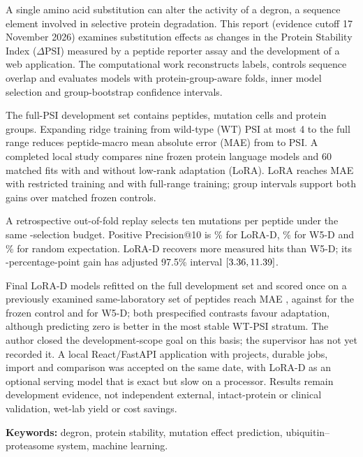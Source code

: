 
A single amino acid substitution can alter the activity of a degron, a sequence element involved in
selective protein degradation. This report (evidence cutoff 17 November 2026) examines
substitution effects as changes in the Protein Stability Index ($\Delta$PSI) measured by a peptide
reporter assay and the development of a web application.
The computational work reconstructs labels, controls sequence overlap and evaluates models with
protein-group-aware folds, inner model selection and group-bootstrap confidence intervals.

The full-PSI development set contains \nVthreeNPeptides{} peptides, \nVthreeNCells{} mutation cells
and \nVthreeNGroups{} protein groups. Expanding ridge training from wild-type (WT) PSI at most 4 to the full
range reduces peptide-macro mean absolute error (MAE) from \nVthreeRidgeB{} to \nVthreeRidgeD{} PSI.
A completed local study compares nine frozen protein language models and 60 matched fits with
and without low-rank adaptation (LoRA). LoRA reaches \nCampaignLoraB{} MAE with restricted
training and \nCampaignLoraD{} with full-range training; group intervals support both gains over
matched frozen controls.

A retrospective out-of-fold replay selects ten mutations per peptide under the same
\nPrioritySelections{}-selection budget. Positive Precision@10 is \nPriorityLoraPrecision\% for
LoRA-D, \nPriorityWfivePrecision\% for W5-D and \nPriorityRandomPrecision\% for random
expectation. LoRA-D recovers \nPriorityExtraHits{} more measured hits than W5-D; its
\nPriorityDeltaWfive{}-percentage-point gain has adjusted 97.5\% interval
$[3.36, 11.39]{}$.

Final LoRA-D models refitted on the full development set and scored once on a previously
examined same-laboratory set of \nTPeptides{} peptides reach MAE \nTLoraMae{}, against
\nTFrozenMae{} for the frozen control and \nTWfiveMae{} for W5-D; both prespecified contrasts favour
adaptation, although predicting zero is better in the most stable WT-PSI stratum. The author closed
the development-scope goal on this basis; the supervisor has not yet recorded it. A local
React/FastAPI application with projects, durable jobs, import and comparison was accepted on the same
date, with LoRA-D as an optional serving model that is exact but slow on a processor. Results remain
development evidence, not independent external, intact-protein or clinical validation, wet-lab yield
or cost savings.

\par\vspace{6bp}\noindent\textbf{Keywords:} degron, protein stability, mutation effect prediction, ubiquitin--proteasome system, machine learning.

